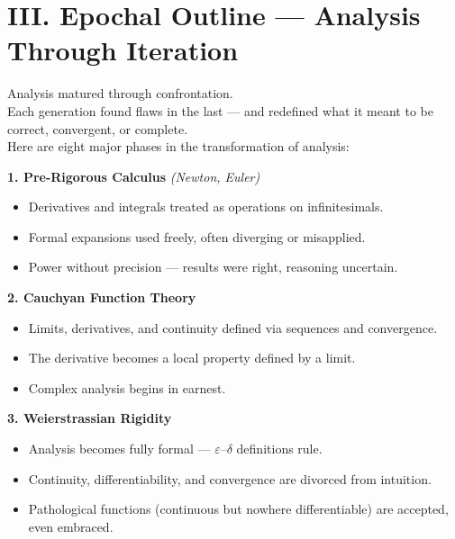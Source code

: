\documentclass[9pt]{article}
\begin{document}
\newpage

\section*{III. Epochal Outline — Analysis Through Iteration}

\noindent
Analysis matured through confrontation.\\

\noindent
Each generation found flaws in the last — and redefined what it meant to be correct, convergent, or complete.\\

\noindent
Here are eight major phases in the transformation of analysis:

\bigskip

\textbf{1. Pre-Rigorous Calculus} \hfill \textit{(Newton, Euler)}

\begin{itemize}
  \item Derivatives and integrals treated as operations on infinitesimals.
  \item Formal expansions used freely, often diverging or misapplied.
  \item Power without precision — results were right, reasoning uncertain.
\end{itemize}

\bigskip

\textbf{2. Cauchyan Function Theory}

\begin{itemize}
  \item Limits, derivatives, and continuity defined via sequences and convergence.
  \item The derivative becomes a local property defined by a limit.
  \item Complex analysis begins in earnest.
\end{itemize}

\bigskip

\textbf{3. Weierstrassian Rigidity}

\begin{itemize}
  \item Analysis becomes fully formal — $\varepsilon$–$\delta$ definitions rule.
  \item Continuity, differentiability, and convergence are divorced from intuition.
  \item Pathological functions (continuous but nowhere differentiable) are accepted, even embraced.
\end{itemize}
\end{document}
